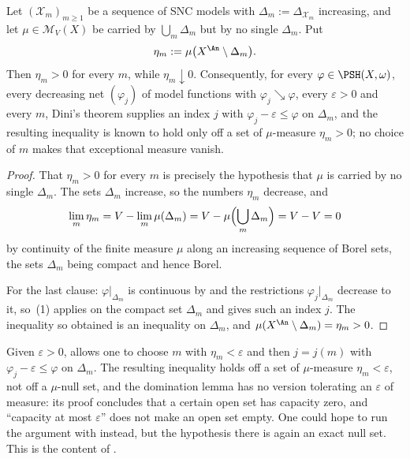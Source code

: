 \begin{proposition}
\label{prop:ch29-one-complex}
Let \((\mathcal X_m)_{m\geq1}\) be a sequence of SNC models with
\(\Delta_m:=\Delta_{\mathcal X_m}\) increasing, and let
\(\mu\in\mathcal M_V(X)\) be carried by
\(\bigcup_m\Delta_m\) but by no single \(\Delta_m\).  Put
\[
 \eta_m:=\mu\bigl(X^{\An}\setminus\Delta_m\bigr).
\]
Then \(\eta_m>0\) for every \(m\), while \(\eta_m\downarrow0\).
Consequently, for every \(\varphi\in\PSH(X,\omega)\), every decreasing net
\((\varphi_j)\) of model functions with \(\varphi_j\searrow\varphi\), every
\(\varepsilon>0\) and every \(m\), Dini's theorem supplies an index
\(j\) with \(\varphi_j-\varepsilon\leq\varphi\) on \(\Delta_m\), and the
resulting inequality is known to hold only off a set of \(\mu\)-measure
\(\eta_m>0\); no choice of \(m\) makes that exceptional measure vanish.
\end{proposition}

\begin{proof}
That \(\eta_m>0\) for every \(m\) is precisely the hypothesis that \(\mu\)
is carried by no single \(\Delta_m\).  The sets \(\Delta_m\) increase, so
the numbers \(\eta_m\) decrease, and
\[
 \lim_m\eta_m=V-\lim_m\mu(\Delta_m)
  =V-\mu\Bigl(\bigcup_m\Delta_m\Bigr)=V-V=0
\]
by continuity of the finite measure \(\mu\) along an increasing sequence of
Borel sets, the sets \(\Delta_m\) being compact and hence Borel.

For the last clause: \(\varphi|_{\Delta_m}\) is continuous by
 and the restrictions
\(\varphi_j|_{\Delta_m}\) decrease to it, so
\,(1) applies on the compact set \(\Delta_m\) and gives
such an index \(j\).  The inequality so obtained is an inequality on
\(\Delta_m\), and \(\mu(X^{\An}\setminus\Delta_m)=\eta_m>0\).
\end{proof}

\begin{remark}
\label{rem:ch29-no-diagonal}
Given \(\varepsilon>0\),  allows one to choose
\(m\) with \(\eta_m<\varepsilon\) and then \(j=j(m)\) with
\(\varphi_j-\varepsilon\leq\varphi\) on \(\Delta_m\).  The resulting
inequality holds off a set of \(\mu\)-measure \(\eta_m<\varepsilon\), not
off a \(\mu\)-null set, and the domination lemma
 has no version tolerating an
\(\varepsilon\) of measure: its proof concludes that a certain open set has
capacity zero, and ``capacity at most \(\varepsilon\)'' does not make an
open set empty.  One could hope to run the argument with
 instead, but the hypothesis there is
again an exact null set.  This is the content of
.
\end{remark}

